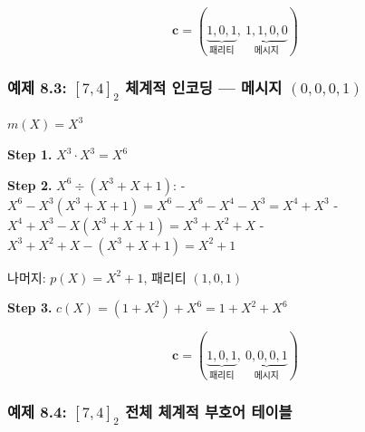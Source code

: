 \documentclass[
  oneside]{article}
\begin{document}
\[\mathbf{c} = (\underbrace{1, 0, 1}_{\text{패리티}},\ \underbrace{1, 1, 0, 0}_{\text{메시지}})\]

\subsubsection{\texorpdfstring{예제 8.3: \([7, 4]_2\) 체계적 인코딩 ---
메시지
\((0, 0, 0, 1)\)}{예제 8.3: {[}7, 4{]}\_2 체계적 인코딩 --- 메시지 (0, 0, 0, 1)}}\label{uxc608uxc81c-8.3-7-4_2-uxccb4uxacc4uxc801-uxc778uxcf54uxb529-uxba54uxc2dcuxc9c0-0-0-0-1}

\(m(X) = X^3\)

\textbf{Step 1.} \(X^3 \cdot X^3 = X^6\)

\textbf{Step 2.} \(X^6 \div (X^3 + X + 1)\): -
\(X^6 - X^3(X^3 + X + 1) = X^6 - X^6 - X^4 - X^3 = X^4 + X^3\) -
\(X^4 + X^3 - X(X^3 + X + 1) = X^3 + X^2 + X\) -
\(X^3 + X^2 + X - (X^3 + X + 1) = X^2 + 1\)

나머지: \(p(X) = X^2 + 1\), 패리티 \((1, 0, 1)\)

\textbf{Step 3.} \(c(X) = (1 + X^2) + X^6 = 1 + X^2 + X^6\)

\[\mathbf{c} = (\underbrace{1, 0, 1}_{\text{패리티}},\ \underbrace{0, 0, 0, 1}_{\text{메시지}})\]

\subsubsection{\texorpdfstring{예제 8.4: \([7, 4]_2\) 전체 체계적 부호어
테이블}{예제 8.4: {[}7, 4{]}\_2 전체 체계적 부호어 테이블}}\label{uxc608uxc81c-8.4-7-4_2-uxc804uxccb4-uxccb4uxacc4uxc801-uxbd80uxd638uxc5b4-uxd14cuxc774uxbe14}
\end{document}
